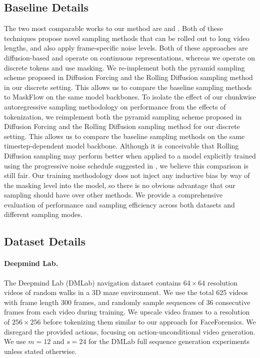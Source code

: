 \subsection{Baseline Details}

The two most comparable works to our method are \citet{chen2024diffusionforcing} and \citet{ruhe2024rollingdiffusionmodels}. Both of these techniques propose novel sampling methods that can be rolled out to long video lengths, and also apply frame-specific noise levels. Both of these approaches are diffusion-based and operate on continuous representations, whereas we operate on discrete tokens and use masking. We re-implement both the pyramid sampling scheme proposed in Diffusion Forcing and the Rolling Diffusion sampling method in our discrete setting. This allows us to compare the baseline sampling methods to MaskFlow on the same model backbones. 
%
To isolate the effect of our chunkwise autoregressive sampling methodology on performance from the effects of tokenization, we reimplement both the pyramid sampling scheme proposed in Diffusion Forcing and the Rolling Diffusion sampling method for our discrete setting. This allows us to compare the baseline sampling methods on the same timestep-dependent model backbone. 
%
Although it is conceivable that Rolling Diffusion sampling may perform better when applied to a model explicitly trained using the progressive noise schedule suggested in \citet{ruhe2024rollingdiffusionmodels}, we believe this comparison is still fair. Our training methodology does not inject any inductive bias by way of the masking level into the model, so there is no obvious advantage that our sampling should have over other methods. 
We provide a comprehensive evaluation of performance and sampling efficiency across both datasets and different sampling modes.


\subsection{Dataset Details}

\paragraph{Deepmind Lab.} The Deepmind Lab (DMLab) navigation dataset contains $64 \times 64$ resolution videos of random walks in a 3D maze environment. We use the total 625 videos with frame length 300 frames, and randomly sample sequences of 36 consecutive frames from each video during training. We upscale video frames to a resolution of $256 \times 256$ before tokenizing them similar to our approach for FaceForensics. We disregard the provided actions, focusing on action-unconditional video generation. We use $m=12$ and $s=24$ for the DMLab full sequence generation experiments unless stated otherwise.

